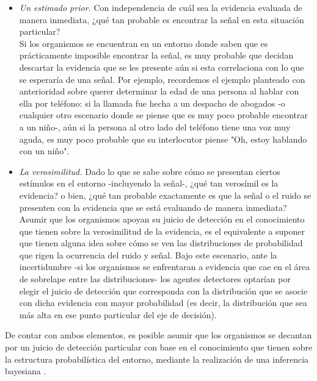 \begin{itemize}
\item \textsl{Un estimado prior.} Con independencia de cuál sea la evidencia evaluada de manera inmediata, ¿qué tan probable es encontrar la señal en esta situación particular?\\

Si los organismos se encuentran en un entorno donde saben que es prácticamente imposible encontrar la señal, es muy probable que decidan descartar la evidencia que se les presente aún si esta correlaciona con lo que se esperaría de una señal. Por ejemplo, recordemos el ejemplo planteado con anterioridad sobre querer determinar la edad de una persona al hablar con ella por teléfono: si la llamada fue hecha a un despacho de abogados -o cualquier otro escenario donde se piense que es muy poco probable encontrar a un niño-, aún si la persona al otro lado del teléfono tiene una voz muy aguda, es muy poco probable que su interlocutor piense "Oh, estoy hablando con un niño".\\

\item \textsl{La verosimilitud.} Dado lo que se sabe sobre cómo se presentan ciertos estímulos en el entorno -incluyendo la señal-, ¿qué tan verosímil es la evidencia? o bien, ¿qué tan probable exactamente es que la señal o el ruido se presenten con la evidencia que se está evaluando de manera inmediata?\\

Asumir que los organismos apoyan su juicio de detección en el conocimiento que tienen sobre la verosimilitud de la evidencia, es el equivalente a suponer que tienen alguna idea sobre cómo se ven las distribuciones de probabilidad que rigen la ocurrencia del ruido y señal. Bajo este escenario, ante la incertidumbre -si los organismos se enfrentaran a evidencia que cae en el área de sobrelape entre las distribuciones- los agentes detectores optarían por elegir el juicio de detección que corresponda con la distribución que se asocie con dicha evidencia con mayor probabilidad (es decir, la distribución que sea más alta en ese punto particular del eje de decisión).\\
\end{itemize}

De contar con ambos elementos, es posible asumir que los organismos se decantan por un juicio de detección particular con base en el conocimiento que tienen sobre la estructura probabilística del entorno, mediante la realización de una inferencia bayesiana \parencite{WeijiMa, WeijiMa2012, Pouget2013}.\\

